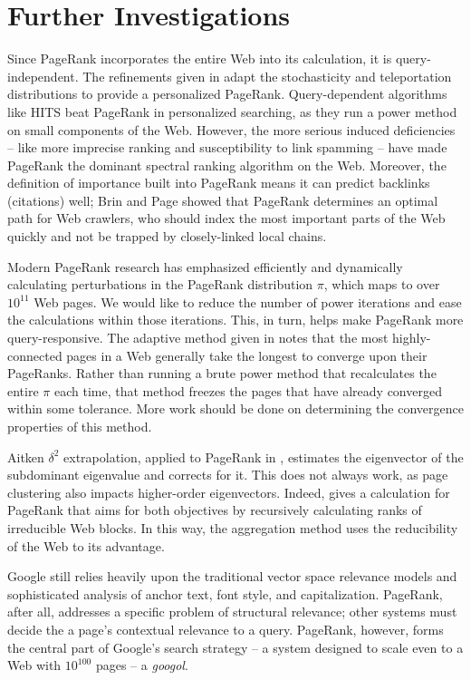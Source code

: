 \documentclass[11pt,letterpaper]{amsart}
\begin{document}
\section{Further Investigations}
Since PageRank incorporates the entire Web into its calculation, it is
query-independent. The refinements given in
\cite{haveliwalaAnalyticalComparisonApproaches2003} adapt the stochasticity and
teleportation distributions to provide a personalized PageRank. Query-dependent
algorithms like HITS beat PageRank in personalized searching, as they run a
power method on small components of the Web. However, the more serious induced
deficiencies -- like more imprecise ranking and susceptibility to link spamming
-- have made PageRank the dominant spectral ranking algorithm on the Web.
Moreover, the definition of importance built into PageRank means it can predict
backlinks (citations) well; Brin and Page \cite{brinPageRankCitationRanking1998}
showed that PageRank determines an optimal path for Web crawlers, who should
index the most important parts of the Web quickly and not be trapped by
closely-linked local chains.

Modern PageRank research has emphasized efficiently and dynamically calculating
perturbations in the PageRank distribution $\pi$, which maps to over $10^{11}$
Web pages. We would like to reduce the number of power iterations and ease the
calculations within those iterations. This, in turn, helps make PageRank more
query-responsive. The adaptive method given in
\cite{berkhinSurveyPageRankComputing2005} notes that the most highly-connected
pages in a Web generally take the longest to converge upon their PageRanks.
Rather than running a brute power method that recalculates the entire $\pi$ each
time, that method freezes the pages that have already converged within some
tolerance. More work should be done on determining the convergence properties of
this method.

Aitken $\delta^2$ extrapolation, applied to PageRank in
\cite{langvilleGooglePageRankScience2006}, estimates the eigenvector of the
subdominant eigenvalue and corrects for it. This does not always work, as page
clustering also impacts higher-order eigenvectors. Indeed,
\cite{kamvarExploitingBlockStructure2003} gives a calculation for PageRank that
aims for both objectives by recursively calculating ranks of irreducible Web
blocks. In this way, the aggregation method uses the reducibility of the Web to
its advantage.

Google still relies heavily upon the traditional vector space relevance models
and sophisticated analysis of anchor text, font style, and capitalization.
PageRank, after all, addresses a specific problem of structural relevance; other
systems must decide the a page's contextual relevance to a query. PageRank,
however, forms the central part of Google's search strategy -- a system designed
to scale even to a Web with $10^{100}$ pages -- a \textit{googol}.

\newpage


\end{document}
